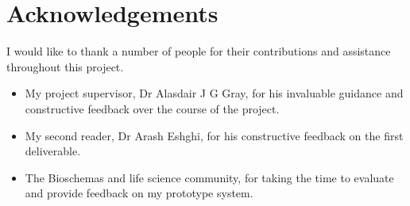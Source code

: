 \chapter*{Acknowledgements}
I would like to thank a number of people for their contributions and assistance throughout this project.

\begin{itemize}
\item My project supervisor, Dr Alasdair J G Gray, for his invaluable guidance and constructive feedback over the course of the project.
\item My second reader, Dr Arash Eshghi, for his constructive feedback on the first deliverable.
\item The Bioschemas and life science community, for taking the time to evaluate and provide feedback on my prototype system.
\end{itemize}